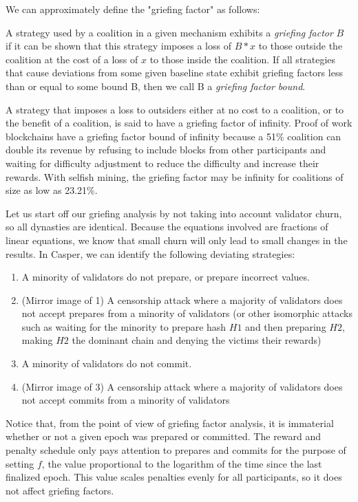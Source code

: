 \documentclass[12pt]{article}
\begin{document}
We can approximately define the "griefing factor" as follows:

A strategy used by a coalition in a given mechanism exhibits a \textit{griefing factor} $B$ if it can be shown that this strategy imposes a loss of $B * x$ to those outside the coalition at the cost of a loss of $x$ to those inside the coalition. If all strategies that cause deviations from some given baseline state exhibit griefing factors less than or equal to some bound B, then we call B a \textit{griefing factor bound}.

A strategy that imposes a loss to outsiders either at no cost to a coalition, or to the benefit of a coalition, is said to have a griefing factor of infinity. Proof of work blockchains have a griefing factor bound of infinity because a 51\% coalition can double its revenue by refusing to include blocks from other participants and waiting for difficulty adjustment to reduce the difficulty and increase their rewards. With selfish mining, the griefing factor may be infinity for coalitions of size as low as 23.21\%.

Let us start off our griefing analysis by not taking into account validator churn, so all dynasties are identical. Because the equations involved are fractions of linear equations, we know that small churn will only lead to small changes in the results. In Casper, we can identify the following deviating strategies:

\begin{enumerate}
\item A minority of validators do not prepare, or prepare incorrect values.
\item (Mirror image of 1) A censorship attack where a majority of validators does not accept prepares from a minority of validators (or other isomorphic attacks such as waiting for the minority to prepare hash $H1$ and then preparing $H2$, making $H2$ the dominant chain and denying the victims their rewards)
\item A minority of validators do not commit.
\item (Mirror image of 3) A censorship attack where a majority of validators does not accept commits from a minority of validators
\end{enumerate}

Notice that, from the point of view of griefing factor analysis, it is immaterial whether or not a given epoch was prepared or committed. The reward and penalty schedule only pays attention to prepares and commits for the purpose of setting $f$, the value proportional to the logarithm of the time since the last finalized epoch. This value scales penalties evenly for all participants, so it does not affect griefing factors.
\end{document}
